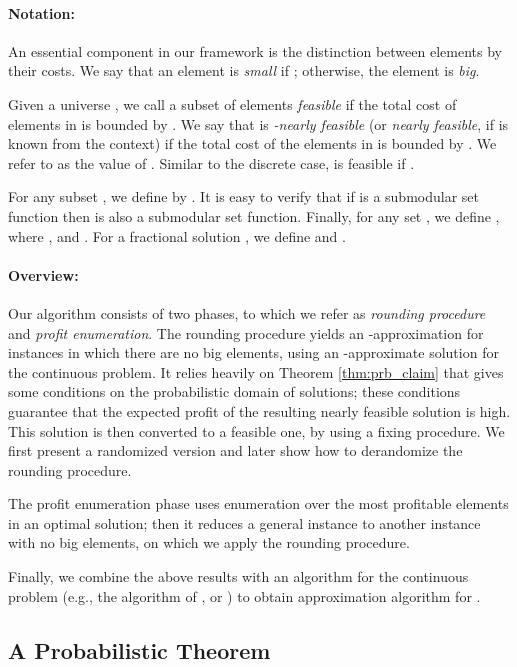 \documentclass[11pt]{article}
\begin{document}
{\paragraph{Notation:}
An essential component in our framework is the distinction between
elements by their costs. We say that an element 
is \emph{small} if ; otherwise,
the element is \emph{big}.




Given a universe , we call a subset of elements 
{\em feasible} if the total cost of elements in  is bounded by
. We say that   is \emph{-nearly feasible} (or
\emph{nearly feasible}, if  is known from the context) if the total
cost of the elements in  is bounded by . We refer
to  as the value of . Similar to the discrete case,
 is feasible if .

For any subset , we define  by . It is easy to
verify that if  is a submodular set function then  is also
a submodular set function. Finally, for any set ,
we define , where , and
 .  For a fractional solution , we
define  and
.


\paragraph{Overview:}
Our algorithm consists of two phases, to which we refer as
{\em rounding procedure} and {\em profit enumeration}. The rounding procedure
yields an -approximation for
instances in which there are no big elements, using an
-approximate solution for the continuous problem. It relies heavily
on Theorem \ref{thm:prb_claim} that gives some conditions on the
probabilistic domain of solutions; these conditions guarantee that the
expected profit of the resulting nearly feasible solution is high. This
solution is then converted to a feasible one, by using a
fixing procedure. We first present a randomized version
and later show
how to derandomize the rounding procedure.


The profit enumeration phase uses enumeration over the most
profitable elements in an optimal solution; then it reduces
a general instance to another instance with no big elements,
on which we apply the rounding procedure.

Finally, we combine the above results with an algorithm for the
continuous problem (e.g., the algorithm of \cite{Vo08}, or
\cite{LMNS09}) to obtain approximation algorithm for .

\subsection{A Probabilistic Theorem}
\label{sec:prb_claim}

}
\end{document}
